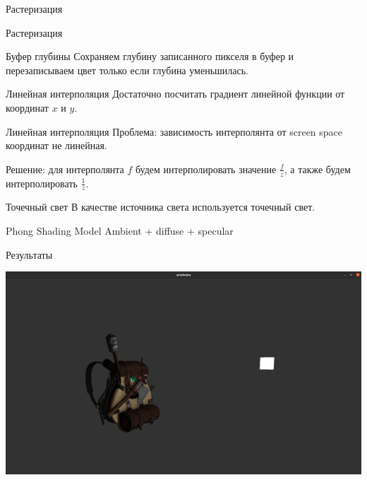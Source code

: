 \documentclass{beamer}
\begin{document}
\begin{frame}{Растеризация}
\end{frame}

\begin{frame}{Растеризация}
\end{frame}

\begin{frame}{Буфер глубины}
Сохраняем глубину записанного пикселя в буфер и перезаписываем 
цвет только если глубина уменьшилась. 
\end{frame}

\begin{frame}{Линейная интерполяция}
    Достаточно посчитать градиент линейной функции от координат 
    $x$ и $y$.
\end{frame}
\begin{frame}{Линейная интерполяция}
    Проблема: зависимость интерполянта от screen space координат 
    не линейная. 

    Решение: для интерполянта $f$ будем интерполировать значение
    $\frac{f}{z}$, а также будем интерполировать $\frac{1}{z}$.

\end{frame}

\begin{frame}{Точечный свет}
В качестве источника света используется точечный свет.
\end{frame}

\begin{frame}{Phong Shading Model}
    Ambient + diffuse + specular
\end{frame}

\begin{frame}{Результаты}
    \begin{center}
    \includegraphics[width=1 \linewidth]{backpack_far.png}
    \end{center}
\end{frame}
\end{document}
